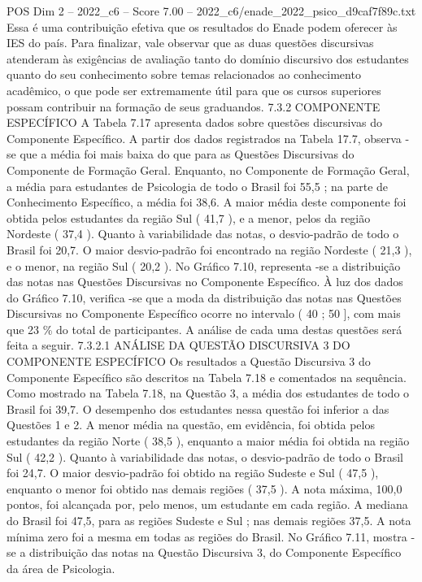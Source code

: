 \begin{textsample}{POS Dim 2 – 2022\_c6 – Score 7.00 – 2022\_c6/enade\_2022\_psico\_d9caf7f89c.txt}
Essa é uma contribuição efetiva que os resultados do Enade podem oferecer às IES do país.
Para finalizar, vale observar que as duas questões discursivas atenderam às exigências de avaliação tanto do domínio discursivo dos estudantes quanto do seu conhecimento sobre temas relacionados ao conhecimento acadêmico, o que pode ser extremamente útil para que os cursos superiores possam contribuir na formação de seus graduandos. 7.3.2 COMPONENTE ESPECÍFICO A Tabela 7.17 apresenta dados sobre questões discursivas do Componente Específico.
A partir dos dados registrados na Tabela 17.7, observa -se que a média foi mais baixa do que para as Questões Discursivas do Componente de Formação Geral.
Enquanto, no Componente de Formação Geral, a média para estudantes de Psicologia de todo o Brasil foi 55,5 ; na parte de Conhecimento Específico, a média foi 38,6.
A maior média deste componente foi obtida pelos estudantes da região Sul ( 41,7 ), e a menor, pelos da região Nordeste ( 37,4 ).
Quanto à variabilidade das notas, o desvio-padrão de todo o Brasil foi 20,7.
O maior desvio-padrão foi encontrado na região Nordeste ( 21,3 ), e o menor, na região Sul ( 20,2 ).
No Gráfico 7.10, representa -se a distribuição das notas nas Questões Discursivas no Componente Específico.
À luz dos dados do Gráfico 7.10, verifica -se que a moda da distribuição das notas nas Questões Discursivas no Componente Específico ocorre no intervalo ( 40 ; 50 ], com mais que 23 \% do total de participantes.
A análise de cada uma destas questões será feita a seguir. 7.3.2.1 ANÁLISE DA QUESTÃO DISCURSIVA 3 DO COMPONENTE ESPECÍFICO Os resultados a Questão Discursiva 3 do Componente Específico são descritos na Tabela 7.18 e comentados na sequência.
Como mostrado na Tabela 7.18, na Questão 3, a média dos estudantes de todo o Brasil foi 39,7.
O desempenho dos estudantes nessa questão foi inferior a das Questões 1 e 2.
A menor média na questão, em evidência, foi obtida pelos estudantes da região Norte ( 38,5 ), enquanto a maior média foi obtida na região Sul ( 42,2 ).
Quanto à variabilidade das notas, o desvio-padrão de todo o Brasil foi 24,7.
O maior desvio-padrão foi obtido na região Sudeste e Sul ( 47,5 ), enquanto o menor foi obtido nas demais regiões ( 37,5 ).
A nota máxima, 100,0 pontos, foi alcançada por, pelo menos, um estudante em cada região.
A mediana do Brasil foi 47,5, para as regiões Sudeste e Sul ; nas demais regiões 37,5.
A nota mínima zero foi a mesma em todas as regiões do Brasil.
No Gráfico 7.11, mostra -se a distribuição das notas na Questão Discursiva 3, do Componente Específico da área de Psicologia.

\end{textsample}
